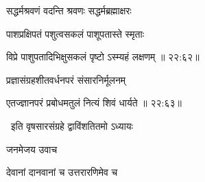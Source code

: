 \ujvers{}

\nemslokab

{\devanagarifont सद्धर्मश्रवणं वदन्ति श्रवणः सद्धर्मब्रह्माक्षरः  \danda\dontdisplaylinenum }%
 
\nemslokac

{\devanagarifont पाशप्रक्षिपतं पशुत्वसकलं पाशूपतास्ते स्मृताः }%
  \dontdisplaylinenum


\nemslokad

{\devanagarifont विप्रे पाशुपतादिभिक्षुसकलं पृष्टो ऽस्म्यहं लक्षणम् {॥ २२:६२॥} \veg\dontdisplaylinenum }%
 
\ujvers{}

\nemslokab

{\devanagarifont प्रज्ञासंग्रहशीतवर्धनपरं संसारनिर्मूलनम्  \danda\dontdisplaylinenum }%
 
\nemslokac

{\devanagarifont   }%
  \dontdisplaylinenum


\nemslokad

{\devanagarifont एतज्ज्ञानपरं प्रबोधमतुलं नित्यं शिवं धार्यते {॥ २२:६३॥} \veg\dontdisplaylinenum }%
 
\vers


{\devanagarifont 
\jump
\begin{center}
\ketdanda~इति वृषसारसंग्रहे द्वाविंशतितमो ऽध्यायः~\ketdanda
\end{center}
\dontdisplaylinenum\vers  }%
 \bekveg\szamveg
\vfill
\phpspagebreak

\thispagestyle{empty}

\centerline{\Large\devanagarifontbold [   त्रयोविंशतितमो ऽध्यायः  ]}{\vrule depth10pt width0pt} 
\fancyhead[LE]{}
\fancyhead[RE]{}
\fancyhead[LO]{}
\fancyhead[RO]{}
\szam\bek


\vers


{\devanagarifont जनमेजय उवाच {\dandab}\dontdisplaylinenum  }%
 
{\devanagarifont देवानां दानवानां च उत्तरारणिमेव च \thinspace{\danda} \dontdisplaylinenum }%


